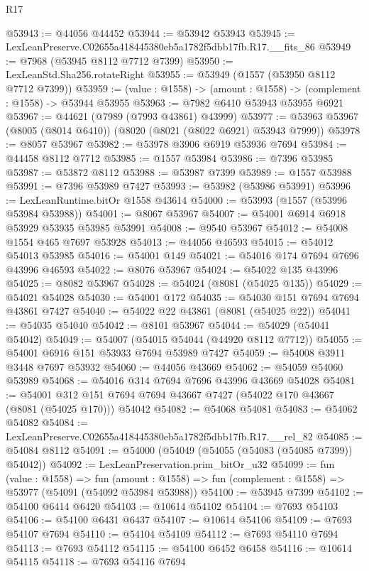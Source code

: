 \begin{lexlean}{R17}
\begin{coremodule}
@53943 := @44056 @44452
@53944 := @53942 @53943
@53945 := LexLeanPreserve.C02655a418445380eb5a1782f5dbb17fb.R17.__fits_86
@53949 := @7968 (@53945 @8112 @7712 @7399)
@53950 := LexLeanStd.Sha256.rotateRight
@53955 := @53949 (@1557 (@53950 @8112 @7712 @7399))
@53959 := (value : @1558) -> (amount : @1558) -> (complement : @1558) -> @53944 @53955
@53963 := @7982 @6410 @53943 @53955 @6921
@53967 := @44621 (@7989 (@7993 @43861) @43999)
@53977 := @53963 @53967 (@8005 (@8014 @6410)) (@8020 (@8021 (@8022 @6921) @53943 @7999))
@53978 := @8057 @53967
@53982 := @53978 @3906 @6919 @53936 @7694
@53984 := @44458 @8112 @7712
@53985 := @1557 @53984
@53986 := @7396 @53985
@53987 := @53872 @8112
@53988 := @53987 @7399
@53989 := @1557 @53988
@53991 := @7396 @53989 @7427
@53993 := @53982 (@53986 @53991)
@53996 := LexLeanRuntime.bitOr @1558 @43614
@54000 := @53993 (@1557 (@53996 @53984 @53988))
@54001 := @8067 @53967
@54007 := @54001 @6914 @6918 @53929 @53935 @53985 @53991
@54008 := @9540 @53967
@54012 := @54008 @1554 @465 @7697 @53928
@54013 := @44056 @46593
@54015 := @54012 @54013 @53985
@54016 := @54001 @149
@54021 := @54016 @174 @7694 @7696 @43996 @46593
@54022 := @8076 @53967
@54024 := @54022 @135 @43996
@54025 := @8082 @53967
@54028 := @54024 (@8081 (@54025 @135))
@54029 := @54021 @54028
@54030 := @54001 @172
@54035 := @54030 @151 @7694 @7694 @43861 @7427
@54040 := @54022 @22 @43861 (@8081 (@54025 @22))
@54041 := @54035 @54040
@54042 := @8101 @53967
@54044 := @54029 (@54041 @54042)
@54049 := @54007 (@54015 @54044 (@44920 @8112 @7712))
@54055 := @54001 @6916 @151 @53933 @7694 @53989 @7427
@54059 := @54008 @3911 @3448 @7697 @53932
@54060 := @44056 @43669
@54062 := @54059 @54060 @53989
@54068 := @54016 @314 @7694 @7696 @43996 @43669 @54028
@54081 := @54001
    @312
    @151
    @7694
    @7694
    @43667
    @7427
    (@54022 @170 @43667 (@8081 (@54025 @170)))
    @54042
@54082 := @54068 @54081
@54083 := @54062 @54082
@54084 := LexLeanPreserve.C02655a418445380eb5a1782f5dbb17fb.R17.__rel_82
@54085 := @54084 @8112
@54091 := @54000 (@54049 (@54055 (@54083 (@54085 @7399)) @54042))
@54092 := LexLeanPreservation.prim_bitOr_u32
@54099 := fun (value : @1558) =>
  fun (amount : @1558) => fun (complement : @1558) => @53977 (@54091 (@54092 @53984 @53988))
@54100 := @53945 @7399
@54102 := @54100 @6414 @6420
@54103 := @10614 @54102
@54104 := @7693 @54103
@54106 := @54100 @6431 @6437
@54107 := @10614 @54106
@54109 := @7693 @54107 @7694
@54110 := @54104 @54109
@54112 := @7693 @54110 @7694
@54113 := @7693 @54112
@54115 := @54100 @6452 @6458
@54116 := @10614 @54115
@54118 := @7693 @54116 @7694

\end{coremodule}
\end{lexlean}
